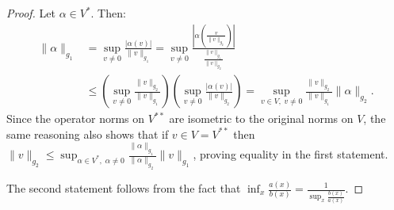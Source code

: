 \documentclass[11pt]{article}
\begin{document}
\begin{proof}

Let $\alpha \in V^*$. Then:
\begin{align*}\|\alpha\|_{g_1} &= \sup_{v \ne 0} \frac{|\alpha(v)|}{\|v\|_{g_1}} = \sup_{v \ne 0} \frac{\left|\alpha\left(\frac{v}{\|v\|_{g_2}}\right)\right|}{\frac{\|v\|_{g_1}}{\|v\|_{g_2}}}\\
&\le \left(\sup_{v \ne 0} \frac{\|v\|_{g_2}}{\|v\|_{g_1}}\right)\left(\sup_{v \ne 0} \frac{|\alpha(v)|}{\|v\|_{g_2}}\right) = \sup_{v \in V,\; v \ne 0} \frac{\|v\|_{g_2}}{\|v\|_{g_1}}\|\alpha\|_{g_2}.\end{align*}
Since the operator norms on $V^{**}$ are isometric to the original norms on $V$, the same reasoning also shows that if $v \in V = V^{**}$ then $\|v\|_{g_2} \le \sup_{\alpha \in V^*,\;\alpha \ne 0}\frac{\|\alpha\|_{g_1}}{\|\alpha\|_{g_2}}\|v\|_{g_1}$, proving equality in the first statement.

The second statement follows from the fact that $\inf_x \frac{a(x)}{b(x)} = \frac{1}{\sup_x \frac{b(x)}{a(x)}}$.
\end{proof}
\end{document}
